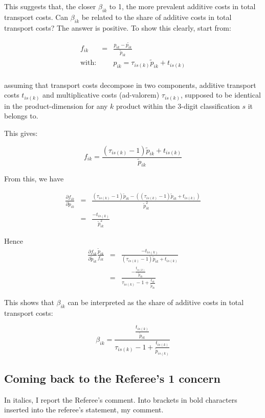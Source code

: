 \documentclass[a4paper,12pt]{article}
\begin{document}
This suggests that, the closer $\beta_{ik}$ to 1, the more prevalent additive costs in total transport costs. Can $\beta_{ik}$ be related to the share of additive costs in total transport costs? The answer is positive. To show this clearly, start from:

\begin{eqnarray*}
f_{ik} &=& \frac{p_{ik}-\tilde{p_{ik}}}{\tilde{p}_{ik}}\\
\text{with}:&& p_{ik} = \tau_{is(k)}\tilde{p}_{ik} + t_{is(k)} \\
\end{eqnarray*}

assuming that transport costs decompose in two components, additive transport costs $t_{is(k)}$ and multiplicative costs (ad-valorem) $\tau_{is(k)}$, supposed to be identical in the product-dimension for any $k$ product within the 3-digit classification $s$ it belongs to.

This gives:

$$f_{ik} = \frac{(\tau_{is(k)}-1)\tilde{p}_{ik}+t_{is(k)}}{\tilde{p}_{ik}}$$

From this, we have

\begin{eqnarray*}
\frac{\partial f_{ik}}{\partial \tilde{p}_{ik}} &=& \frac{(\tau_{is(k)}-1)\tilde{p}_{ik} - ((\tau_{is(k)}-1)\tilde{p}_{ik} +t_{is(k)})}{\tilde{p}_{ik}^2} \\
&=& \frac{-t_{is(k)}}{\tilde{p}_{ik}^2}
\end{eqnarray*}

Hence
\begin{eqnarray*}
\frac{\partial f_{ik}}{\partial \tilde{p}_{ik}} \frac{\tilde{p}_{ik}}{f_{ik}}&=& \frac{-t_{is(k)}}{(\tau_{is(k)}-1)\tilde{p}_{ik} +t_{is(k)}}\\
&=& \frac{-\frac{t_{is(k)}}{\tilde{p}_{ik}}}{\tau_{is(k)}-1 +\frac{t_{ik}}{\tilde{p}_{ik}}}
\end{eqnarray*}

This shows that $\beta_{ik}$ can be interpreted as the share of additive costs in total transport costs:

$$\beta_{ik} = \frac{\frac{t_{is(k)}}{\tilde{p}_{ik}}}{\tau_{is(k)}-1 + \frac{t_{is(k)}}{\tilde{p}_{is(k)}}} $$

\subsection{Coming back to the Referee's 1 concern}

In italics, I report the Referee's comment. Into brackets in bold characters inserted into the referee's statement, my comment.
\end{document}

